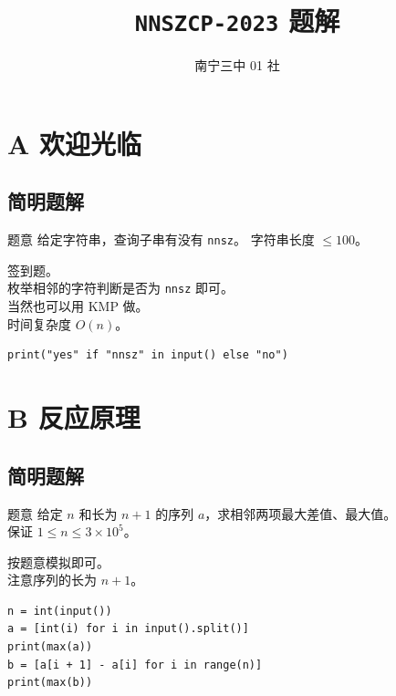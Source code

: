 \documentclass[11pt, fontset = fandol]{ctexbeamer}
\title{\texttt{NNSZCP-2023} 题解}
\author{南宁三中 01 社}
\begin{document}
\begin{frame}
  \maketitle
\end{frame}
\section{A 欢迎光临}
\subsection{简明题解}
\begin{frame}[fragile]
  \pause
  \begin{block}{题意}
    给定字符串，查询子串有没有 \texttt{nnsz}。
    字符串长度 $\le 100$。
  \end{block}
  \pause
  签到题。\\
  \pause
  枚举相邻的字符判断是否为 \texttt{nnsz} 即可。\\
  \pause
  当然也可以用 KMP 做。\\
  \pause
  时间复杂度 $O(n)$。\\
  \begin{lstlisting}
print("yes" if "nnsz" in input() else "no")
  \end{lstlisting}
\end{frame}

\section{B 反应原理}
\subsection{简明题解}
\begin{frame}[fragile]
  \pause
  \begin{block}{题意}
    给定 $n$ 和长为 $n+1$ 的序列 $a$，求相邻两项最大差值、最大值。\\
    保证 $1 \le n \le 3 \times 10^5$。

  \end{block}
  按题意模拟即可。\\
  \pause
  注意序列的长为 $n+1$。\\
  \pause
  \begin{lstlisting}
n = int(input())
a = [int(i) for i in input().split()]
print(max(a))
b = [a[i + 1] - a[i] for i in range(n)]
print(max(b))
  \end{lstlisting}
\end{frame}
\end{document}
